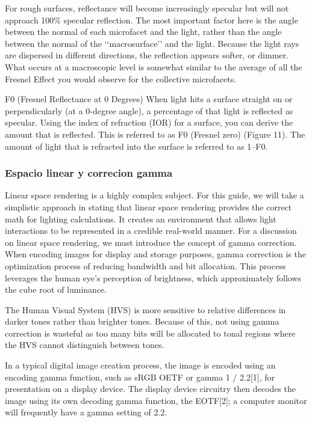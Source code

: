             For rough surfaces, reflectance will become increasingly specular but will not approach 100\%
            specular reflection. The most important factor here is the angle between the normal of each
            microfacet and the light, rather than the angle between the normal of the ‘‘macrosurface’’ and
            the light. Because the
            light rays are dispersed in different directions, the reflection appears softer, or dimmer. What
            occurs at a macroscopic level is somewhat similar to the average of all the Fresnel Effect you
            would observe for the collective microfacets.
            
            F0 (Fresnel Reflectance at 0 Degrees)
            When light hits a surface straight on or perpendicularly (at a 0-degree angle), a percentage of that
            light is reflected as specular. Using the index of refraction (IOR) for a surface, you can derive
            the amount that is reflected. This is referred to as F0 (Fresnel zero) (Figure 11). The amount of
            light that is refracted into the surface is referred to as 1–F0.

        \subsubsection{Espacio linear y correcion gamma}
            Linear space rendering is a highly complex subject. For this guide, we will take a simplistic approach in
            stating that linear space rendering provides the correct math for lighting calculations. It creates an
            environment that allows light interactions to be represented in a credible real-world manner. For a
            discussion on linear space rendering, we must introduce the concept of gamma correction. When encoding images
            for display and storage purposes, gamma correction is the optimization process of reducing bandwidth and bit
            allocation. This process leverages the human eye’s perception of brightness, which approximately follows the
            cube root of luminance.

            The Human Visual System (HVS) is more sensitive to relative differences in darker tones rather than brighter
            tones. Because of this, not using gamma correction is wasteful as too many bits will be allocated to tonal
            regions where the HVS cannot distinguish between tones.
            
            In a typical digital image creation process, the image is encoded using an encoding gamma function, such as
            sRGB OETF or gamma 1 / 2.2[1], for presentation on a display device. The display device circuitry then decodes
            the image using its own decoding gamma function, the EOTF[2]; a computer monitor will frequently have a gamma
            setting of 2.2.
            
